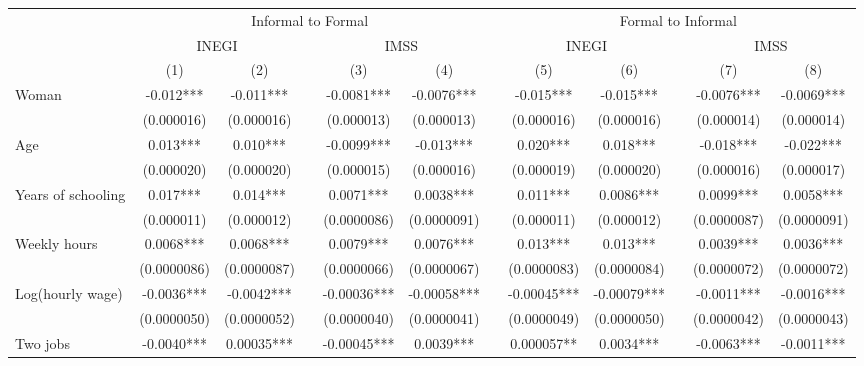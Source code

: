 \begin{tabular}{lccccccccccc}
\toprule
      & \multicolumn{5}{c}{Informal to Formal } &       & \multicolumn{5}{c}{Formal to Informal} \\
\cmidrule{2-6}\cmidrule{8-12}      & \multicolumn{2}{c}{INEGI} &       & \multicolumn{2}{c}{IMSS} &       & \multicolumn{2}{c}{INEGI} &       & \multicolumn{2}{c}{IMSS} \\
\cmidrule{2-3}\cmidrule{5-6}\cmidrule{8-9}\cmidrule{11-12}      & (1)   & (2)   &       & (3)   & (4)   &       & (5)   & (6)   &       & (7)   & (8) \\
\midrule
\midrule
Woman & -0.012*** & -0.011*** &       & -0.0081*** & -0.0076*** &       & -0.015*** & -0.015*** &       & -0.0076*** & -0.0069*** \\
      & (0.000016) & (0.000016) &       & (0.000013) & (0.000013) &       & (0.000016) & (0.000016) &       & (0.000014) & (0.000014) \\
Age   & 0.013*** & 0.010*** &       & -0.0099*** & -0.013*** &       & 0.020*** & 0.018*** &       & -0.018*** & -0.022*** \\
      & (0.000020) & (0.000020) &       & (0.000015) & (0.000016) &       & (0.000019) & (0.000020) &       & (0.000016) & (0.000017) \\
Years of schooling & 0.017*** & 0.014*** &       & 0.0071*** & 0.0038*** &       & 0.011*** & 0.0086*** &       & 0.0099*** & 0.0058*** \\
      & (0.000011) & (0.000012) &       & (0.0000086) & (0.0000091) &       & (0.000011) & (0.000012) &       & (0.0000087) & (0.0000091) \\
Weekly hours & 0.0068*** & 0.0068*** &       & 0.0079*** & 0.0076*** &       & 0.013*** & 0.013*** &       & 0.0039*** & 0.0036*** \\
      & (0.0000086) & (0.0000087) &       & (0.0000066) & (0.0000067) &       & (0.0000083) & (0.0000084) &       & (0.0000072) & (0.0000072) \\
Log(hourly wage) & -0.0036*** & -0.0042*** &       & -0.00036*** & -0.00058*** &       & -0.00045*** & -0.00079*** &       & -0.0011*** & -0.0016*** \\
      & (0.0000050) & (0.0000052) &       & (0.0000040) & (0.0000041) &       & (0.0000049) & (0.0000050) &       & (0.0000042) & (0.0000043) \\
Two jobs & -0.0040*** & 0.00035*** &       & -0.00045*** & 0.0039*** &       & 0.000057** & 0.0034*** &       & -0.0063*** & -0.0011*** \\

\end{tabular}
